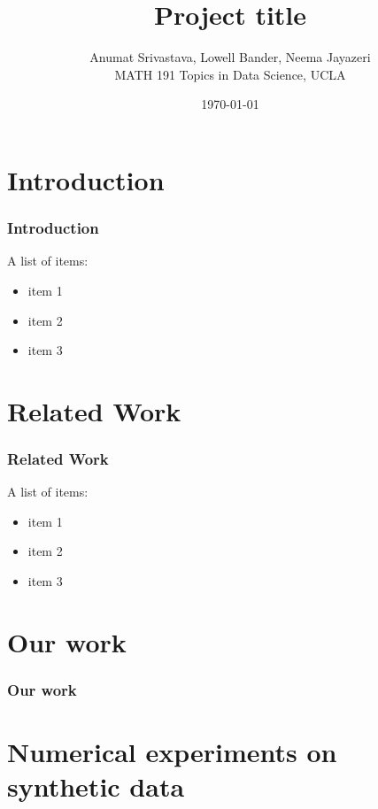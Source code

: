 \documentclass{beamer}
\title{Project title}
\author{ Anumat Srivastava, Lowell Bander, Neema Jayazeri\\
\vspace{5mm}
MATH 191 Topics in Data Science, UCLA}
\date{ \today}
\begin{document}
\newtheorem{theo}{Theorem}
\newtheorem{lem}{Lemma}
\newtheorem{defin}{Definition}
\newtheorem{prop}{Proposition}
\newtheorem{ex}{Example}
\newtheorem{alg}{Algorithm}
\newtheorem{cor}{Corollary}
\newtheorem{case}{Case}


\begin{frame}
  \titlepage
\end{frame}



\section{Introduction}

\begin{frame}
     \frametitle{Introduction}
A list of items:
\begin{itemize}
\item item 1
\item  item 2
\item  item 3
\end{itemize}
\end{frame}



\section{Related Work}

\begin{frame}
     \frametitle{Related Work}
A list of items:
\begin{itemize}
\item item 1
\item  item 2
\item  item 3
\end{itemize}
\end{frame}




 


\section{Our work}    \label{sec:ourWork}

\begin{frame}
     \frametitle{ Our work}
\end{frame}



\section{Numerical experiments on synthetic data}  \label{sec:NumExpSyn}
\end{document}
